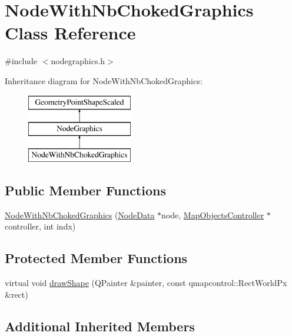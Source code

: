 \hypertarget{class_node_with_nb_choked_graphics}{}\section{Node\+With\+Nb\+Choked\+Graphics Class Reference}
\label{class_node_with_nb_choked_graphics}


{\ttfamily \#include $<$nodegraphics.\+h$>$}

Inheritance diagram for Node\+With\+Nb\+Choked\+Graphics\+:\begin{figure}[H]
\begin{center}
\leavevmode
\includegraphics[height=3.000000cm]{dc/daf/class_node_with_nb_choked_graphics}
\end{center}
\end{figure}
\subsection*{Public Member Functions}
\begin{DoxyCompactItemize}
\item 
\mbox{\hyperlink{class_node_with_nb_choked_graphics_a83407d5fab4b0431154708fcb008078f}{Node\+With\+Nb\+Choked\+Graphics}} (\mbox{\hyperlink{class_node_data}{Node\+Data}} $\ast$node, \mbox{\hyperlink{class_map_objects_controller}{Map\+Objects\+Controller}} $\ast$controller, int indx)
\end{DoxyCompactItemize}
\subsection*{Protected Member Functions}
\begin{DoxyCompactItemize}
\item 
virtual void \mbox{\hyperlink{class_node_with_nb_choked_graphics_aebe997d9fe4273c85dcbd24272658a0c}{draw\+Shape}} (Q\+Painter \&painter, const qmapcontrol\+::\+Rect\+World\+Px \&rect)
\end{DoxyCompactItemize}
\subsection*{Additional Inherited Members}


